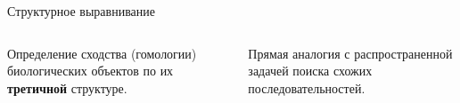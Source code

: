 \documentclass[utf8, professionalfonts]{beamer}
\begin{document}
\begin{frame}{Структурное выравнивание}
\begin{columns}[c]

    Определение сходства (гомологии) биологических объектов по их \textbf{третичной} структуре.
    
    \vspace{11pt}
    Прямая аналогия с распространенной задачей поиска схожих последовательностей.

\end{columns}
\end{frame}
\end{document}
